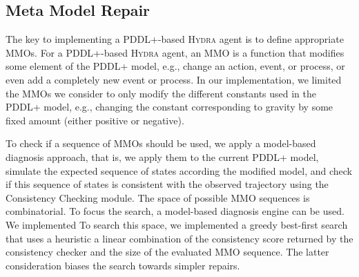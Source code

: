 \documentclass[letterpaper]{article} %
\newcommand{\hydra}{\textsc{Hydra}\xspace} %
\begin{document}


\subsection{Meta Model Repair}


The key to implementing a PDDL+-based \hydra agent is to define appropriate MMOs. 
For a PDDL+-based \hydra agent, an MMO is a function that modifies some element of the PDDL+ model, e.g., change an action, event, or process, or even add a completely new event or process. 
In our implementation, we limited the MMOs we consider to only modify the different constants used in the PDDL+ model, e.g., changing the constant corresponding to gravity by some fixed amount (either positive or negative). 


To check if a sequence of MMOs should be used, we apply a model-based diagnosis approach, that is, we apply them to the current PDDL+ model, simulate the expected sequence of states according the modified model, and check if this sequence of states is consistent with the observed trajectory using the Consistency Checking module. 
The space of possible MMO sequences is combinatorial. 
To focus the search, a model-based diagnosis engine can be used. 
We implemented 
To search this space, we implemented a greedy best-first search that uses a heuristic a linear combination of the consistency score returned by the consistency checker and the size of the evaluated MMO sequence. 
The latter consideration biases the search towards simpler repairs. 
\end{document}
